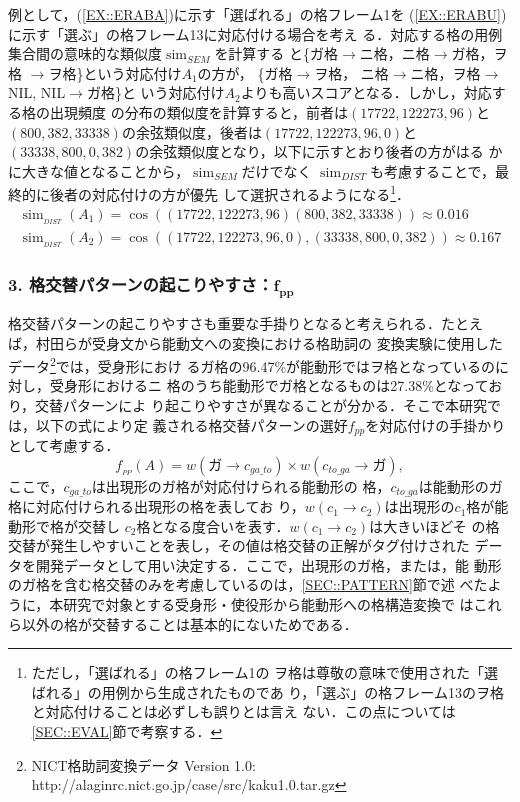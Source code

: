\documentclass[japanese]{jnlp_1.4}
\begin{document}
   例として，(\ref{EX::ERABA})に示す「選ばれる」の格フレーム1を
   (\ref{EX::ERABU})に示す「選ぶ」の格フレーム13に対応付ける場合を考え
   る．対応する格の用例集合間の意味的な類似度$\operatorname{sim}_{SEM}$を計算する
   と\mbox{\{ガ格$\rightarrow$}ニ格，ニ格$\rightarrow$ガ格，ヲ格
   $\rightarrow$ヲ格\}という対応付け$A_1$の方が， \{ガ格$\rightarrow$ヲ格，
   ニ格$\rightarrow$ニ格，ヲ格$\rightarrow$NIL, NIL$\rightarrow$ガ格\}と
   いう対応付け$A_2$よりも高いスコアとなる．しかし，対応する格の出現頻度
   の分布の類似度を計算すると，前者は$(17722,122273,96)$と
   $(800,382,33338)$の余弦類似度，後者は$(17722,122273,96,0)$と
   $(33338,800,0,382)$の余弦類似度となり，以下に示すとおり後者の方がはる
   かに大きな値となることから，$\operatorname{sim}_{SEM}$だけでなく
   $\operatorname{sim}_{DIST}$も考慮することで，最終的に後者の対応付けの方が優先
   して選択されるようになる\footnote{ただし，「選ばれる」の格フレーム1の
   ヲ格は尊敬の意味で使用された「選ばれる」の用例から生成されたものであ
   り，「選ぶ」の格フレーム13のヲ格と対応付けることは必ずしも誤りとは言え
   ない．この点については\ref{SEC::EVAL}節で考察する．}．
\newpage
\begin{gather*}
  \operatorname{sim}_{_{DIST}}(A_1)=\cos((17722,122273,96)
     (800,382,33338))\approx 0.016 \\
  \operatorname{sim}_{_{DIST}}(A_2)=\cos((17722,122273,96,0),
     (33338,800,0,382))\approx 0.167
\end{gather*}


\subsubsection*{3. 格交替パターンの起こりやすさ：$\boldsymbol{f_{pp}}$}

   格交替パターンの起こりやすさも重要な手掛りとなると考えられる．たとえ
   ば，村田ら\cite{Murata2008}が受身文から能動文への変換における格助詞の
   変換実験に使用したデータ\footnote{NICT格助詞変換データ Version 1.0:
   http://alaginrc.nict.go.jp/case/src/kaku1.0.tar.gz}では，受身形におけ
   るガ格の96.47\%が能動形ではヲ格となっているのに対し，受身形におけるニ
   格のうち能動形でガ格となるものは27.38\%となっており，交替パターンによ
   り起こりやすさが異なることが分かる．そこで本研究では，以下の式により定
   義される格交替パターンの選好$f_{pp}$を対応付けの手掛かりとして考慮する．
   \begin{equation}
    f_{_\mathit{PP}}(A)=w(ガ\rightarrow c_\mathit{ga\_to})\times w(c_\mathit{to\_ga}
     \rightarrow ガ), \label{EQ::SP}
   \end{equation}
   ここで，$c_\mathit{ga\_to}$は出現形のガ格が対応付けられる能動形の
   格，$c_\mathit{to\_ga}$は能動形のガ格に対応付けられる出現形の格を表してお
   り，$w(c_1 \rightarrow c_2)$は出現形の$c_1$格が能動形で格が交替し
   $c_2$格となる度合いを表す．$w(c_1 \rightarrow  c_2)$は大きいほどそ
   の格交替が発生しやすいことを表し，その値は格交替の正解がタグ付けされた
   データを開発データとして用い決定する．ここで，出現形のガ格，または，能
   動形のガ格を含む格交替のみを考慮しているのは，\ref{SEC::PATTERN}節で述
   べたように，本研究で対象とする受身形・使役形から能動形への格構造変換で
   はこれら以外の格が交替することは基本的にないためである．
  
\end{document}
